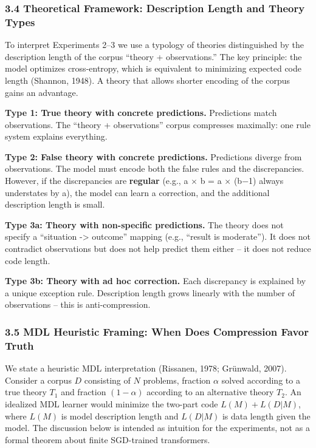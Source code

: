 \documentclass[
  11pt,
]{article}
\begin{document}
\subsubsection{3.4 Theoretical Framework: Description Length and Theory
Types}\label{theoretical-framework-description-length-and-theory-types}

To interpret Experiments 2--3 we use a typology of theories
distinguished by the description length of the corpus ``theory +
observations.'' The key principle: the model optimizes cross-entropy,
which is equivalent to minimizing expected code length (Shannon, 1948).
A theory that allows shorter encoding of the corpus gains an advantage.

\textbf{Type 1: True theory with concrete predictions.} Predictions
match observations. The ``theory + observations'' corpus compresses
maximally: one rule system explains everything.

\textbf{Type 2: False theory with concrete predictions.} Predictions
diverge from observations. The model must encode both the false rules
and the discrepancies. However, if the discrepancies are
\textbf{regular} (e.g., a \ensuremath{\times} b = a \ensuremath{\times} (b\ensuremath{-}1) always understates by a), the
model can learn a correction, and the additional description length is
small.

\textbf{Type 3a: Theory with non-specific predictions.} The theory does
not specify a ``situation -\textgreater{} outcome'' mapping (e.g.,
``result is moderate''). It does not contradict observations but does
not help predict them either -- it does not reduce code length.

\textbf{Type 3b: Theory with ad hoc correction.} Each discrepancy is
explained by a unique exception rule. Description length grows linearly
with the number of observations -- this is anti-compression.

\subsubsection{3.5 MDL Heuristic Framing: When Does Compression Favor
Truth}\label{mdl-heuristic-framing-when-does-compression-favor-truth}

We state a heuristic MDL interpretation (Rissanen, 1978; Grünwald,
2007). Consider a corpus \(D\) consisting of \(N\) problems, fraction
\(\alpha\) solved according to a true theory \(T_1\) and fraction
\((1 - \alpha)\) according to an alternative theory \(T_2\). An
idealized MDL learner would minimize the two-part code
\(L(M) + L(D|M)\), where \(L(M)\) is model description length and
\(L(D|M)\) is data length given the model. The discussion below is
intended as intuition for the experiments, not as a formal theorem about
finite SGD-trained transformers.
\end{document}
